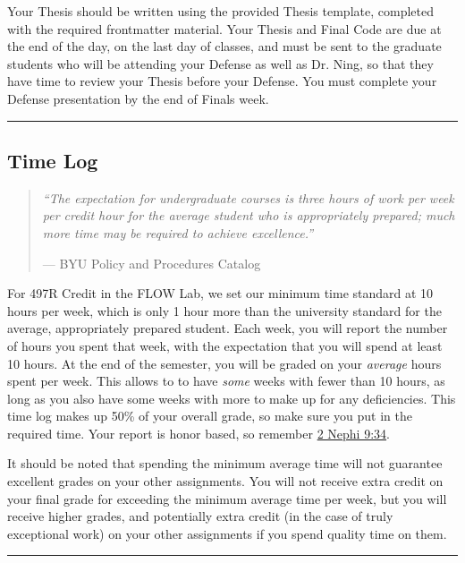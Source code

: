 \documentclass[12pt]{article}
\begin{document}
Your Thesis should be written using the provided Thesis template, completed with the required frontmatter material.
Your Thesis and Final Code are due at the end of the day, on the last day of classes, and must be sent to the graduate students who will be attending your Defense as well as Dr. Ning, so that they have time to review your Thesis before your Defense.
You must complete your Defense presentation by the end of Finals week.


\vspace{1em}\hrule\vspace{1em}
\subsection{Time Log}
\label{sec:timelog}

\begin{quote}
\textit{``The expectation for undergraduate courses is three hours of work per week per credit hour for the average student who is appropriately prepared; much more time may be required to achieve excellence.'' }

--- BYU Policy and Procedures Catalog
\end{quote}


For 497R Credit in the FLOW Lab, we set our minimum time standard at 10 hours per week, which is only 1 hour more than the university standard for the average, appropriately prepared student.  
Each week, you will report the number of hours you spent that week, with the expectation that you will spend at least 10 hours.
At the end of the semester, you will be graded on your \textit{average} hours spent per week.
This allows to to have \textit{some} weeks with fewer than 10 hours, as long as you also have some weeks with more to make up for any deficiencies.
This time log makes up 50\% of your overall grade, so make sure you put in the required time.
Your report is honor based, so remember \href{https://www.churchofjesuschrist.org/study/scriptures/bofm/2-ne/9?lang=eng}{2 Nephi 9:34}.

It should be noted that spending the minimum average time will not guarantee excellent grades on your other assignments.  
You will not receive extra credit on your final grade for exceeding the minimum average time per week, but you will receive higher grades, and potentially extra credit (in the case of truly exceptional work) on your other assignments if you spend quality time on them.

\vspace{1em}\hrule\vspace{1em}
\end{document}
